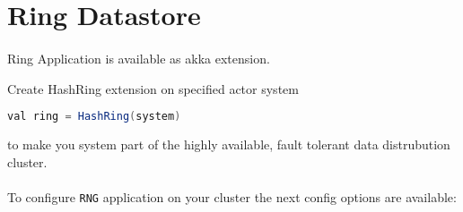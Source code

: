 \section*{Ring Datastore}
\paragraph{}
Ring Application is available as akka extension. 

Create HashRing extension on specified actor system
\begin{lstlisting}[language=Java]
val ring = HashRing(system)
\end{lstlisting}
to make you system part of the highly available, fault tolerant data distrubution cluster.

\paragraph{}
To configure \texttt{RNG} application on your cluster the next config options are available:

